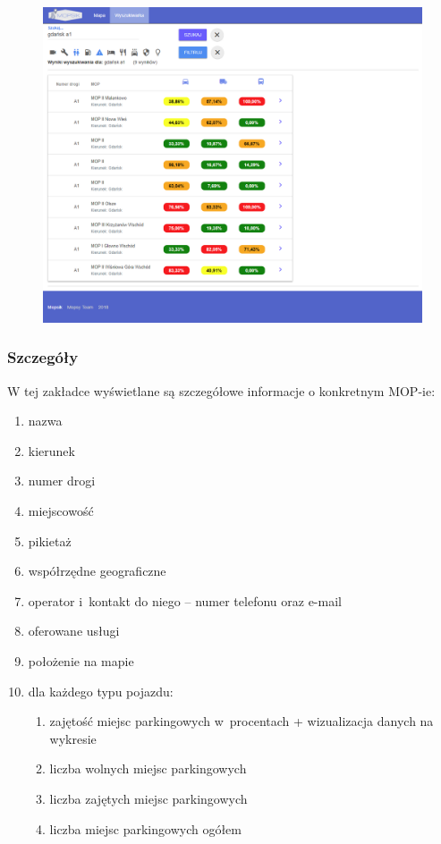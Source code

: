 \begin{figure}[!htb]
\centering
\includegraphics[width=\textwidth]{images/mopsik_www/search.png}
\label{mopsik_www_search}
\end{figure}

\subsubsection{Szczegóły}
W tej zakładce wyświetlane są szczegółowe informacje o konkretnym MOP-ie:
\begin{enumerate}
\item nazwa
\item kierunek
\item numer drogi
\item miejscowość
\item pikietaż
\item współrzędne geograficzne
\item operator i~kontakt do niego -- numer telefonu oraz e-mail
\item oferowane usługi
\item położenie na mapie
\item dla każdego typu pojazdu:
\begin{enumerate}
\item zajętość miejsc parkingowych w~procentach + wizualizacja danych na wykresie
\item liczba wolnych miejsc parkingowych
\item liczba zajętych miejsc parkingowych
\item liczba miejsc parkingowych ogółem
\end{enumerate}
\end{enumerate}


